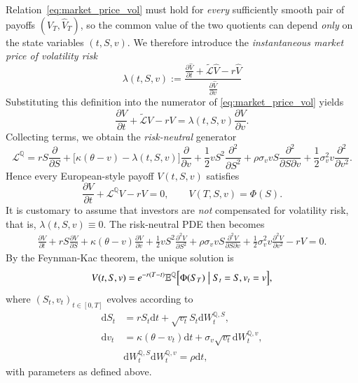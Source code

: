 \documentclass[12pt]{report} %
\theoremstyle{plain} %
\theoremstyle{definition} %
\theoremstyle{remark} %
\begin{document}
Relation~\eqref{eq:market_price_vol} must hold for \emph{every} sufficiently smooth pair of
payoffs $(V_T,\widehat V_T)$, so the common value of the two quotients can depend \emph{only} on the
state variables $(t,S,v)$. We therefore introduce the \emph{instantaneous market price of
volatility risk}
\[
 \lambda(t,S,v)
 := \frac{\frac{\partial \widehat V}{\partial t} + \tilde{\mathcal L} \widehat V - r \widehat V}{\frac{\partial \widehat V}{\partial v}}
\]
Substituting this definition into the numerator of \eqref{eq:market_price_vol} yields
\[
 \frac{\partial V}{\partial t}+\tilde{\mathcal L}V-rV
 =
 \lambda(t,S,v)\frac{\partial V}{\partial v}.
\]
Collecting terms, we obtain the \emph{risk-neutral} generator
\[
 \mathcal L^{\mathbb Q}
 =
 rS\frac{\partial}{\partial S}
 +\bigl[\kappa(\theta-v)-\lambda(t,S,v)\bigr]\frac{\partial}{\partial v}
 +\frac12 vS^{2}\frac{\partial^{2}}{\partial S^{2}}
 +\rho\sigma_v vS\frac{\partial^{2}}{\partial S\partial v}
 +\frac12\sigma_v^{2}v\frac{\partial^{2}}{\partial v^{2}} .
\]
Hence every European-style payoff $V(t,S,v)$ satisfies
\begin{equation}\label{eq:heston_pde_lambda}
 \frac{\partial V}{\partial t}
 +\mathcal L^{\mathbb Q} V
 -rV
 =0,
 \qquad
 V(T,S,v)=\Phi(S).
\end{equation}
It is customary to assume that investors are \emph{not} compensated for volatility risk,
that is, $\lambda(t,S,v)\equiv0$. The risk-neutral PDE then becomes
\begin{equation}
\label{eq:heston_pde}
\begin{aligned}
	\frac{\partial V}{\partial t}+
	rS\frac{\partial V}{\partial S}
 +\kappa(\theta-v)\frac{\partial V}{\partial v}
 +\frac12 vS^{2}\frac{\partial^2V}{\partial S^{2}}
 +\rho\sigma_v vS\frac{\partial^2 V}{\partial S\partial v}
 +\frac12\sigma_v^{2}v\frac{\partial^2 V}{\partial v^{2}}
	 -rV
	 = 0.
\end{aligned}
\end{equation}
By the Feynman-Kac theorem, the unique solution is
\begin{equation}\label{eq:heston_fk}
V(t,S,v)=e^{-r(T-t)}\mathbb E^{\mathbb Q}\Bigl[\Phi(S_T)\bigm|S_t=S,v_t=v\Bigr],
\end{equation}
where $(S_t,v_t)_{t\in[0,T]}$ evolves according to
\begin{equation}\label{eq:heston_sde}
\begin{aligned}
 \mathrm{d}S_t &= rS_t\mathrm{d}t + \sqrt{v_t}S_t\mathrm{d}W_t^{\mathbb Q	,S},\\
 \mathrm{d}v_t &= \kappa(\theta-v_t)\mathrm{
d}t + \sigma_v\sqrt{v_t}\mathrm{d}W_t^{\mathbb Q,v},\\
 &\mathrm{d}W_t^{\mathbb Q,S}\mathrm{d}W_t^{\mathbb Q,v} = \rho\mathrm{d}t,
\end{aligned}
\end{equation}
with parameters as defined above.
\end{document}
